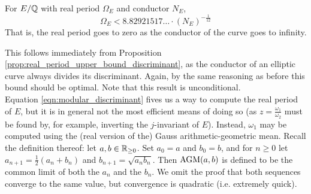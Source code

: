 \begin{corollary}\label{cor:real_period_upper_bound}
For $E/\mathbb{Q}$ with real period $\Omega_E$ and conductor $N_E$,
\begin{equation}
\Omega_E < 8.82921517\ldots \cdot (N_E)^{-\frac{1}{12}}
\end{equation}
That is, the real period goes to zero as the conductor of the curve goes to infinity.
\end{corollary}
This follows immediately from Proposition \ref{prop:real_period_upper_bound_discriminant}, as the conductor of an elliptic curve always divides its discriminant. Again, by the same reasoning as before this bound should be optimal. Note that this result is unconditional. \\

Equation \ref{eqn:modular_discriminant} fives us a way to compute the real period of $E$, but it is in general not the most efficient means of doing so (as $z = \frac{\omega_1}{\omega_2}$ must be found by, for example, inverting the $j$-invariant of $E$). Instead, $\omega_1$ may be computed using the (real version of the) Gauss arithmetic-geometric mean. Recall the definition thereof: let $a,b \in \mathbb{R}_{\ge0}$. Set $a_0 = a$ and $b_0 = b$, and for $n\ge 0$ let $a_{n+1} = \frac{1}{2}(a_{n}+b_{n})$ and $b_{n+1} = \sqrt{a_{n}b_{n}}$. Then $\text{AGM}(a,b)$ is defined to be the common limit of both the $a_n$ and the $b_n$. We omit the proof that both sequences converge to the same value, but convergence is quadratic (i.e. extremely quick).

